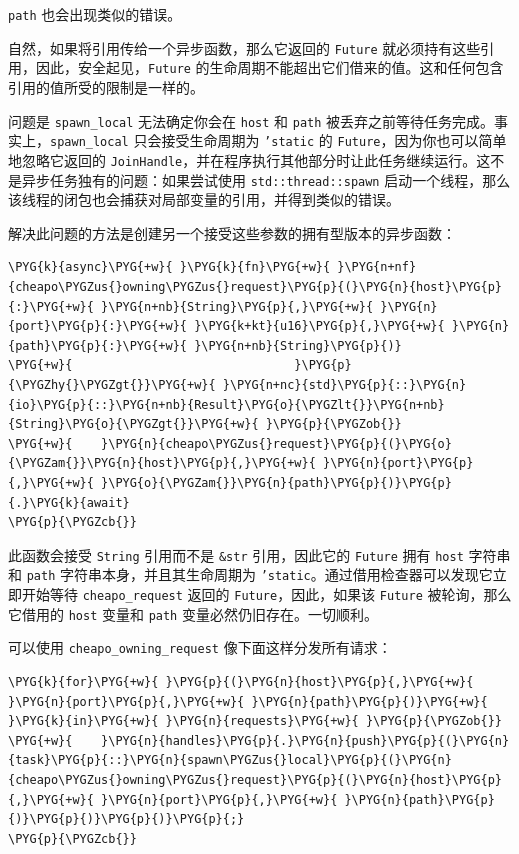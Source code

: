 \texttt{path} 也会出现类似的错误。

自然，如果将引用传给一个异步函数，那么它返回的 \texttt{Future} 就必须持有这些引用，因此，安全起见，\texttt{Future} 的生命周期不能超出它们借来的值。这和任何包含引用的值所受的限制是一样的。

问题是 \texttt{spawn\_local} 无法确定你会在 \texttt{host} 和 \texttt{path} 被丢弃之前等待任务完成。事实上，\texttt{spawn\_local} 只会接受生命周期为 \texttt{'static} 的 \texttt{Future}，因为你也可以简单地忽略它返回的 \texttt{JoinHandle}，并在程序执行其他部分时让此任务继续运行。这不是异步任务独有的问题：如果尝试使用 \texttt{std::thread::spawn} 启动一个线程，那么该线程的闭包也会捕获对局部变量的引用，并得到类似的错误。

解决此问题的方法是创建另一个接受这些参数的拥有型版本的异步函数：

\begin{Verbatim}[commandchars=\\\{\},breaklines=true,breakanywhere=true,fontsize=\codefont,xleftmargin=17bp]
\PYG{k}{async}\PYG{+w}{ }\PYG{k}{fn}\PYG{+w}{ }\PYG{n+nf}{cheapo\PYGZus{}owning\PYGZus{}request}\PYG{p}{(}\PYG{n}{host}\PYG{p}{:}\PYG{+w}{ }\PYG{n+nb}{String}\PYG{p}{,}\PYG{+w}{ }\PYG{n}{port}\PYG{p}{:}\PYG{+w}{ }\PYG{k+kt}{u16}\PYG{p}{,}\PYG{+w}{ }\PYG{n}{path}\PYG{p}{:}\PYG{+w}{ }\PYG{n+nb}{String}\PYG{p}{)}
\PYG{+w}{                               }\PYG{p}{\PYGZhy{}\PYGZgt{}}\PYG{+w}{ }\PYG{n+nc}{std}\PYG{p}{::}\PYG{n}{io}\PYG{p}{::}\PYG{n+nb}{Result}\PYG{o}{\PYGZlt{}}\PYG{n+nb}{String}\PYG{o}{\PYGZgt{}}\PYG{+w}{ }\PYG{p}{\PYGZob{}}
\PYG{+w}{    }\PYG{n}{cheapo\PYGZus{}request}\PYG{p}{(}\PYG{o}{\PYGZam{}}\PYG{n}{host}\PYG{p}{,}\PYG{+w}{ }\PYG{n}{port}\PYG{p}{,}\PYG{+w}{ }\PYG{o}{\PYGZam{}}\PYG{n}{path}\PYG{p}{)}\PYG{p}{.}\PYG{k}{await}
\PYG{p}{\PYGZcb{}}
\end{Verbatim}

此函数会接受 \texttt{String} 引用而不是 \texttt{\&str} 引用，因此它的 \texttt{Future} 拥有 \texttt{host} 字符串和 \texttt{path} 字符串本身，并且其生命周期为 \texttt{'static}。通过借用检查器可以发现它立即开始等待 \texttt{cheapo\_request} 返回的 \texttt{Future}，因此，如果该 \texttt{Future} 被轮询，那么它借用的 \texttt{host} 变量和 \texttt{path} 变量必然仍旧存在。一切顺利。

可以使用 \texttt{cheapo\_owning\_request} 像下面这样分发所有请求：

\begin{Verbatim}[commandchars=\\\{\},breaklines=true,breakanywhere=true,fontsize=\codefont,xleftmargin=17bp]
\PYG{k}{for}\PYG{+w}{ }\PYG{p}{(}\PYG{n}{host}\PYG{p}{,}\PYG{+w}{ }\PYG{n}{port}\PYG{p}{,}\PYG{+w}{ }\PYG{n}{path}\PYG{p}{)}\PYG{+w}{ }\PYG{k}{in}\PYG{+w}{ }\PYG{n}{requests}\PYG{+w}{ }\PYG{p}{\PYGZob{}}
\PYG{+w}{    }\PYG{n}{handles}\PYG{p}{.}\PYG{n}{push}\PYG{p}{(}\PYG{n}{task}\PYG{p}{::}\PYG{n}{spawn\PYGZus{}local}\PYG{p}{(}\PYG{n}{cheapo\PYGZus{}owning\PYGZus{}request}\PYG{p}{(}\PYG{n}{host}\PYG{p}{,}\PYG{+w}{ }\PYG{n}{port}\PYG{p}{,}\PYG{+w}{ }\PYG{n}{path}\PYG{p}{)}\PYG{p}{)}\PYG{p}{)}\PYG{p}{;}
\PYG{p}{\PYGZcb{}}
\end{Verbatim}

